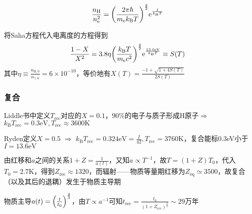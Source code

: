 \begin{equation}
	\frac{n_{\text{H}}}{n_{\mathrm{e}}^2} = \qty(\frac{2 \pi \hbar}{m_{\mathrm{e}} k_{\text{B}} T})^{\frac{3}{2}} \mathrm{e}^{\frac{I}{k_{\text{B}}T}}
\end{equation}


\par 
将Saha方程代入电离度的方程得到
\begin{equation}
	\frac{1 - X}{X^2} = 3.8 \eta \qty(\frac{k_{\text{B}}T}{m_{\mathrm{e}}c^2})^{\frac{3}{2}} \mathrm{e}^{\frac{13.6 \mathrm{eV}}{k_{\text{B}}T}} \equiv S(T)
\end{equation}
其中$\eta \equiv \frac{n_{\text{B}, 0}}{n_{\gamma, 0}} = 6 \times 10^{-10}$，等价地有$X(T) = \frac{-1 + \sqrt{1 + 4 S(T)}}{2 S(T)}$

\subsubsection{复合}
\par 
Liddle书中定义$T_{\text{rec}}$对应的$X = 0.1$，90\%的电子与质子形成H原子$\Rightarrow$ $k_{\text{B}} T_{\text{rec}} = 0.3 \mathrm{eV}, T_{\text{rec}} \approx 3600 \mathrm{K}$
\par 
Ryden定义$X=0.5$ $\Rightarrow$ $k_{\text{B}} T_{\text{rec}} = 0.324 \mathrm{eV} = \frac{I}{42}, T_{\text{rec}} = 3760 \mathrm{K}$，复合能标0.3eV小于$I = 13.6 \mathrm{eV}$

\par 
由红移和$a$之间的关系$1 + Z = \frac{1}{a(t)}$，又知$a \propto T^{-1}$，故$T = (1 + Z) T_0$，代入$T_0 = 2.7 \mathrm{K}$，得到$Z_{\text{rec}} \approx 1320$，而辐射——物质等量期红移为$Z_{\text{eq}} \simeq 3500$，故复合（以及其后的退耦）发生于物质主导期

\par 
物质主导$a(t) = \qty(\frac{t}{t_0})^{\frac{2}{3}}$，由$T \propto a^{-1}$可知$t_{\text{rec}} = \frac{t_0}{(1 + Z_{\text{rec}})^{\frac{3}{2}}} \sim 29 \text{万年}$

